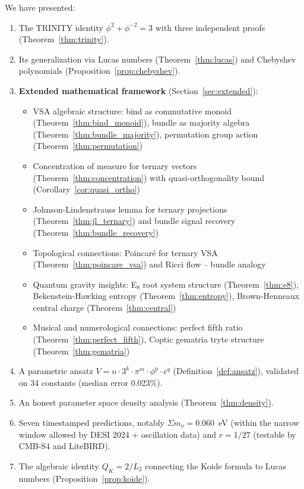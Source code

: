 \documentclass[aps,prd,preprint,superscriptaddress,showpacs,nofootinbib,longbibliography]{revtex4-2}
\begin{document}
We have presented:
\begin{enumerate}
    \item The TRINITY identity $\phi^2 + \phi^{-2} = 3$ with three independent proofs (Theorem~\ref{thm:trinity}).
    \item Its generalization via Lucas numbers (Theorem~\ref{thm:lucas}) and Chebyshev polynomials (Proposition~\ref{prop:chebyshev}).
    \item \textbf{Extended mathematical framework} (Section~\ref{sec:extended}):
    \begin{itemize}
        \item VSA algebraic structure: bind as commutative monoid (Theorem~\ref{thm:bind_monoid}), bundle as majority algebra (Theorem~\ref{thm:bundle_majority}), permutation group action (Theorem~\ref{thm:permutation})
        \item Concentration of measure for ternary vectors (Theorem~\ref{thm:concentration}) with quasi-orthogonality bound (Corollary~\ref{cor:quasi_ortho})
        \item Johnson-Lindenstrauss lemma for ternary projections (Theorem~\ref{thm:jl_ternary}) and bundle signal recovery (Theorem~\ref{thm:bundle_recovery})
        \item Topological connections: Poincar\'e for ternary VSA (Theorem~\ref{thm:poincare_vsa}) and Ricci flow -- bundle analogy
        \item Quantum gravity insights: E$_8$ root system structure (Theorem~\ref{thm:e8}), Bekenstein-Hawking entropy (Theorem~\ref{thm:entropy}), Brown-Henneaux central charge (Theorem~\ref{thm:central})
        \item Musical and numerological connections: perfect fifth ratio (Theorem~\ref{thm:perfect_fifth}), Coptic gematria tryte structure (Theorem~\ref{thm:gematria})
    \end{itemize}
    \item A parametric ansatz $V = n \cdot 3^k \cdot \pi^m \cdot \phi^p \cdot e^q$ (Definition~\ref{def:ansatz}), validated on 34 constants (median error 0.023\%).
    \item An honest parameter space density analysis (Theorem~\ref{thm:density}).
    \item Seven timestamped predictions, notably $\Sigma m_\nu = 0.060$~eV (within the narrow window allowed by DESI 2024 + oscillation data) and $r = 1/27$ (testable by CMB-S4 and LiteBIRD).
    \item The algebraic identity $Q_K = 2/L_2$ connecting the Koide formula to Lucas numbers (Proposition~\ref{prop:koide}).
\end{enumerate}
\end{document}
